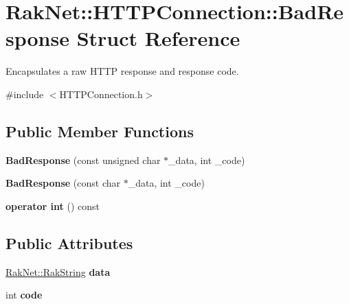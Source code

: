 \hypertarget{struct_rak_net_1_1_h_t_t_p_connection_1_1_bad_response}{\section{Rak\-Net\-:\-:H\-T\-T\-P\-Connection\-:\-:Bad\-Response Struct Reference}
\label{struct_rak_net_1_1_h_t_t_p_connection_1_1_bad_response}
}


Encapsulates a raw H\-T\-T\-P response and response code.  




{\ttfamily \#include $<$H\-T\-T\-P\-Connection.\-h$>$}

\subsection*{Public Member Functions}
\begin{DoxyCompactItemize}
\item 
\hypertarget{struct_rak_net_1_1_h_t_t_p_connection_1_1_bad_response_a4873cb757c2469afede88165ed3295ac}{{\bfseries Bad\-Response} (const unsigned char $\ast$\-\_\-data, int \-\_\-code)}\label{struct_rak_net_1_1_h_t_t_p_connection_1_1_bad_response_a4873cb757c2469afede88165ed3295ac}

\item 
\hypertarget{struct_rak_net_1_1_h_t_t_p_connection_1_1_bad_response_afa60b79ad1c7501b7e2929e2d89b4aeb}{{\bfseries Bad\-Response} (const char $\ast$\-\_\-data, int \-\_\-code)}\label{struct_rak_net_1_1_h_t_t_p_connection_1_1_bad_response_afa60b79ad1c7501b7e2929e2d89b4aeb}

\item 
\hypertarget{struct_rak_net_1_1_h_t_t_p_connection_1_1_bad_response_ab65b638e74f071c3c258fd47b72fa54e}{{\bfseries operator int} () const }\label{struct_rak_net_1_1_h_t_t_p_connection_1_1_bad_response_ab65b638e74f071c3c258fd47b72fa54e}

\end{DoxyCompactItemize}
\subsection*{Public Attributes}
\begin{DoxyCompactItemize}
\item 
\hypertarget{struct_rak_net_1_1_h_t_t_p_connection_1_1_bad_response_adb55e204061121c8d5253acbf424bb45}{\hyperlink{class_rak_net_1_1_rak_string}{Rak\-Net\-::\-Rak\-String} {\bfseries data}}\label{struct_rak_net_1_1_h_t_t_p_connection_1_1_bad_response_adb55e204061121c8d5253acbf424bb45}

\item 
\hypertarget{struct_rak_net_1_1_h_t_t_p_connection_1_1_bad_response_a300adec136062b36b4fea54095fb46fe}{int {\bfseries code}}\label{struct_rak_net_1_1_h_t_t_p_connection_1_1_bad_response_a300adec136062b36b4fea54095fb46fe}

\end{DoxyCompactItemize}


